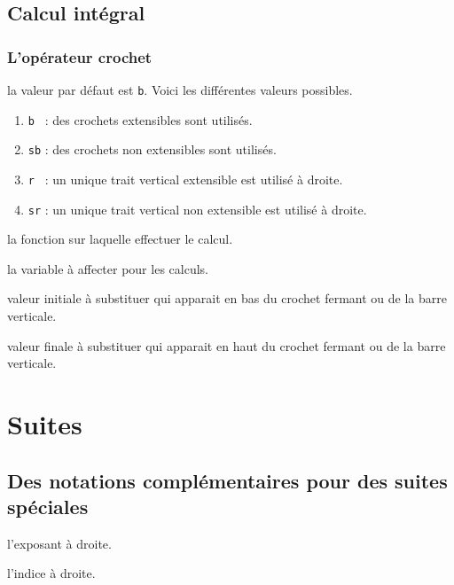 \documentclass[12pt,a4paper]{book}
\theoremstyle{definition}
\begin{document}
{{\subsection{Calcul intégral}

\subsubsection{L'opérateur \og crochet \fg}






\IDoption{} la valeur par défaut est \verb+b+. Voici les différentes valeurs possibles.
\begin{enumerate}
	\item \verb+b + : des crochets extensibles sont utilisés.

	\item \verb+sb+ : des crochets non extensibles sont utilisés.

	\item \verb+r + : un unique trait vertical extensible est utilisé à droite.

	\item \verb+sr+ : un unique trait vertical non extensible est utilisé à droite.
\end{enumerate}

 la fonction sur laquelle effectuer le calcul.

 la variable à affecter pour les calculs.

 valeur initiale à substituer qui apparait en bas du crochet fermant ou de la barre verticale.

 valeur finale à substituer qui apparait en haut du crochet fermant ou de la barre verticale.


\section{Suites}

\subsection{Des notations complémentaires pour des suites spéciales}




 l'exposant à droite.

 l'indice à droite.


}}
\end{document}

